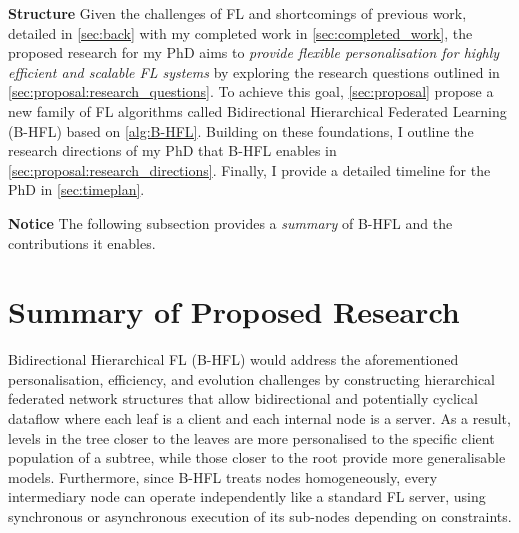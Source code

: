 \noindent \textbf{Structure} Given the challenges of FL and shortcomings of previous work, detailed in \cref{sec:back} with my completed work in \cref{sec:completed_work}, the proposed research for my PhD aims to \emph{provide flexible personalisation for highly efficient and scalable FL systems} by exploring the research questions outlined in \cref{sec:proposal:research_questions}. To achieve this goal, \cref{sec:proposal} propose a new family of FL algorithms called Bidirectional Hierarchical Federated Learning (B-HFL) based on \cref{alg:B-HFL}. Building on these foundations, I outline the research directions of my PhD that B-HFL enables in \cref{sec:proposal:research_directions}. Finally, I provide a detailed timeline for the PhD in \cref{sec:timeplan}.

\noindent \textbf{Notice} The following subsection provides a \emph{summary} of B-HFL and the contributions it enables.
\section{Summary of Proposed Research}
Bidirectional Hierarchical FL (B-HFL) would address the aforementioned personalisation, efficiency, and evolution challenges by constructing hierarchical federated network structures that allow bidirectional and potentially cyclical dataflow where each leaf is a client and each internal node is a server. As a result, levels in the tree closer to the leaves are more personalised to the specific client population of a subtree, while those closer to the root provide more generalisable models. Furthermore, since B-HFL treats nodes homogeneously, every intermediary node can operate independently like a standard FL server, using synchronous or asynchronous execution of its sub-nodes depending on constraints.

